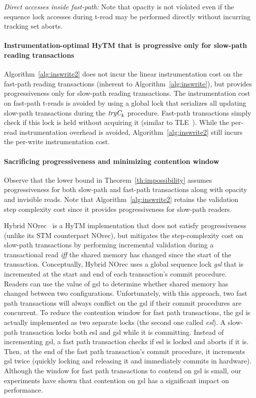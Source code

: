 \vspace{1mm}\noindent\textit{Direct accesses inside fast-path:}
Note that opacity is not violated even if the sequence lock accesses during t-read may be performed directly without incurring tracking set aborts.

\paragraph{Instrumentation-optimal HyTM that is progressive only for slow-path reading transactions}
Algorithm~\ref{alg:inswrite2} does not incur the linear instrumentation cost
on the fast-path reading transactions (inherent to Algorithm~\ref{alg:inswrite}), but provides progressiveness only
for slow-path reading transactions. 
The instrumentation cost on fast-path t-reads is avoided by using a global lock that serializes all updating slow-path transactions
during the $\textit{tryC}_k$ procedure. Fast-path transactions simply check if this lock is held without acquiring it (similar to TLE~\cite{tle}). While the per-read instrumentation overhead
is avoided, Algorithm~\ref{alg:inswrite2} still incurs the per-write instrumentation cost.

\paragraph{Sacrificing progressiveness and minimizing contention window}
Observe that the lower bound in Theorem~\ref{th:impossibility} assumes progressiveness for both slow-path and fast-path transactions
along with opacity and invisible reads. Note that Algorithm~\ref{alg:inswrite2} retains the validation step complexity cost since it provides progressiveness for slow-path readers.

Hybrid NOrec~\cite{hybridnorec} is a HyTM implementation that does not satisfy progressiveness
(unlike its STM counterpart NOrec), but mitigates
the step-complexity cost on slow-path transactions by performing incremental validation 
during a transactional read \emph{iff} 
the shared memory has changed since the start of the transaction.
Conceptually, Hybrid NOrec uses a global sequence lock \emph{gsl} that is incremented 
at the start and end of each transaction's commit procedure.
Readers can use the value of gsl to determine whether shared memory has changed between two configurations.
Unfortunately, with this approach, two fast path transactions will always conflict on the gsl if their 
commit procedures are concurrent.
To reduce the contention window for fast path transactions, the gsl is actually implemented as two separate locks (the second one called \emph{esl}).
A slow-path transaction locks both esl and gsl while it is committing.
Instead of incrementing gsl, a fast path transaction checks if esl is locked and aborts if it is.
Then, at the end of the fast path transaction's commit procedure, 
it increments gsl twice (quickly locking and releasing it and immediately commits in hardware).
Although the window for fast path transactions to contend on gsl is small, our experiments have shown that contention on gsl has a significant impact on performance.

